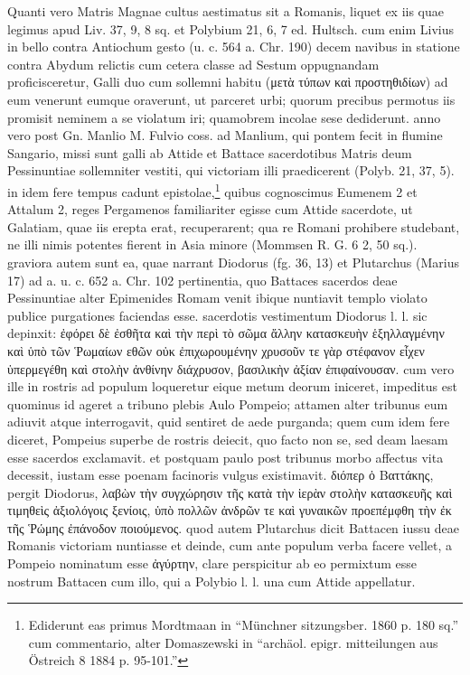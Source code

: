 \documentclass[a4paper, 11pt, oneside, polutonikogreek, german]{article}
\begin{document}
Quanti vero Matris Magnae cultus aestimatus sit a Romanis, liquet ex iis quae legimus apud Liv. 37, 9, 8 sq. et Polybium 21, 6, 7 ed. Hultsch. cum enim Livius in bello contra Antiochum gesto (u. c. 564 a. Chr. 190) decem navibus in statione contra Abydum relictis cum cetera classe ad Sestum oppugnandam proficisceretur, Galli duo cum sollemni habitu (μετὰ τύπων καὶ προστηθιδίων) ad eum venerunt eumque oraverunt, ut parceret urbi; quorum precibus permotus iis promisit neminem a se violatum iri; quamobrem incolae sese dediderunt. anno vero post Gn. Manlio M. Fulvio coss. ad Manlium, qui pontem fecit in flumine Sangario, missi sunt galli ab Attide et Battace sacerdotibus Matris deum Pessinuntiae sollemniter vestiti, qui victoriam illi praedicerent (Polyb. 21, 37, 5). in idem fere tempus cadunt epistolae,\footnote{Ediderunt eas primus Mordtmaan in "`Münchner sitzungsber. 1860 p. 180 sq."' cum commentario, alter Domaszewski in "`archäol. epigr. mitteilungen aus Östreich 8 1884 p. 95-101."'} quibus cognoscimus Eumenem 2 et Attalum 2, reges Pergamenos familiariter egisse cum Attide sacerdote, ut Galatiam, quae iis erepta erat, recuperarent; qua re Romani prohibere studebant, ne illi nimis potentes fierent in Asia minore (Mommsen R. G. 6 2, 50 sq.). graviora autem sunt ea, quae narrant Diodorus (fg. 36, 13) et Plutarchus (Marius 17) ad a. u. c. 652 a. Chr. 102 pertinentia, quo Battaces sacerdos deae Pessinuntiae alter Epimenides Romam venit ibique nuntiavit templo violato publice purgationes faciendas esse. sacerdotis vestimentum Diodorus l. l. sic depinxit: ἐφόρει δὲ ἐσθῆτα καὶ τὴν περὶ τὸ σῶμα ἄλλην κατασκευὴν ἑξηλλαγμένην καὶ ὑπὸ τῶν Ῥωμαίων εθῶν οὐκ ἐπιχωρουμένην χρυσοῦν τε γὰρ στέφανον εἶχεν ὑπερμεγέθη καὶ στολὴν ἀνθίνην διάχρυσον, βασιλικὴν ἀξίαν ἐπιφαίνουσαν. cum vero ille in rostris ad populum loqueretur eique metum deorum iniceret, impeditus est quominus id ageret a tribuno plebis Aulo Pompeio; attamen alter tribunus eum adiuvit atque interrogavit, quid sentiret de aede purganda; quem cum idem fere diceret, Pompeius superbe de rostris deiecit, quo facto non se, sed deam laesam esse sacerdos exclamavit. et postquam paulo post tribunus morbo affectus vita decessit, iustam esse poenam facinoris vulgus existimavit. διόπερ ὁ Βαττάκης, pergit Diodorus, λαβὼν τὴν συγχώρησιν τῆς κατὰ τὴν ἱερὰν στολὴν κατασκευῆς καὶ τιμηθεὶς ἀξιολόγοις ξενίοις, ὑπὸ πολλῶν ἀνδρῶν τε καὶ γυναικῶν προεπέμφθη τὴν ἐκ τῆς Ῥώμης ἐπάνοδον ποιούμενος. quod autem Plutarchus dicit Battacen iussu deae Romanis victoriam nuntiasse et deinde, cum ante populum verba facere vellet, a Pompeio nominatum esse ἀγύρτην, clare perspicitur ab eo permixtum esse nostrum Battacen cum illo, qui a Polybio l. l. una cum Attide appellatur.
\end{document}
